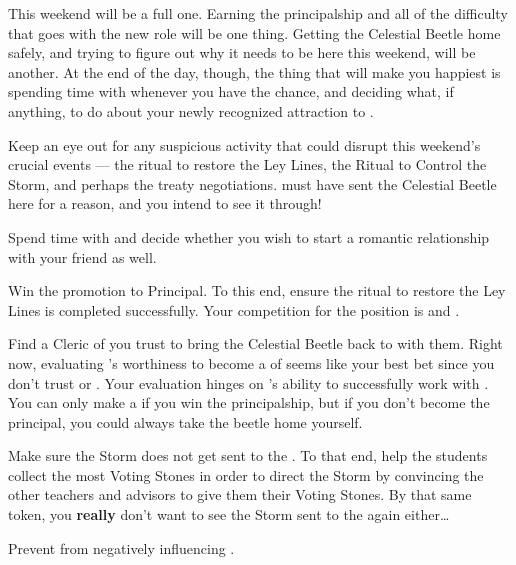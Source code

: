 \documentclass[char]{GL2020}
\begin{document}
This weekend will be a full one. Earning the principalship and all of the difficulty that goes with the new role will be one thing. Getting the Celestial Beetle home safely, and trying to figure out why it needs to be here this weekend, will be another. At the end of the day, though, the thing that will make you happiest is spending time with \cJuniorStatesman{} whenever you have the chance, and deciding what, if anything, to do about your newly recognized attraction to \cEthics{}.

\begin{itemz}
    \item Keep an eye out for any suspicious activity that could disrupt this weekend’s crucial events — the ritual to restore the Ley Lines, the Ritual to Control the Storm, and perhaps the treaty negotiations. \cTechGod{} must have sent the Celestial Beetle here for a reason, and you intend to see it through! 
    \item Spend time with \cJuniorStatesman{} and decide whether you wish to start a romantic relationship with your friend \cEthics{} as well.
    \item Win the promotion to Principal. To this end, ensure the ritual to restore the Ley Lines is completed successfully. Your competition for the position is \cMusic{} and \cChupSecond{}.
    \item Find a Cleric of \cTechGod{} you trust to bring the Celestial Beetle back to \pTech{} with them. Right now, evaluating \cHeadScientist{}'s worthiness to become a \cHeadScientist{\cleric} of \cTechGod{} seems like your best bet since you don’t trust \cAntiChup{} or \cScholarship{}. Your evaluation hinges on \cHeadScientist{}’s ability to successfully work with \cEbbPriest{}. You can only make \cHeadScientist{} a \cHeadScientist{\cleric} if you win the principalship, but if you don't become the principal, you could always take the beetle home yourself.
\end{itemz}

\begin{itemz}
    \item Make sure the Storm does not get sent to the \pTech{}. To that end, help the \pTech{} students collect the most Voting Stones in order to direct the Storm by convincing the other teachers and advisors to give them their Voting Stones. By that same token, you \textbf{really} don’t want to see the Storm sent to the \pShip{} again either\ldots 
    \item Prevent \cAmbition{} from negatively influencing \cHeir{}.
\end{itemz}
\end{document}

